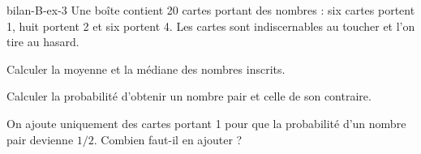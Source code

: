 \begin{blocEdition}{bilan-B-ex-3}
Une boîte contient 20 cartes portant des nombres : six cartes portent 1, huit portent 2 et six portent 4. Les cartes sont indiscernables au toucher et l’on tire au hasard.\begin{questions}
\item Calculer la moyenne et la médiane des nombres inscrits.
\item Calculer la probabilité d’obtenir un nombre pair et celle de son contraire.
\item On ajoute uniquement des cartes portant 1 pour que la probabilité d’un nombre pair devienne $1/2$. Combien faut-il en ajouter ?
\end{questions}\par{}\par\par{}\par{}\par{}\par{}\par{}\par{}
\end{blocEdition}
